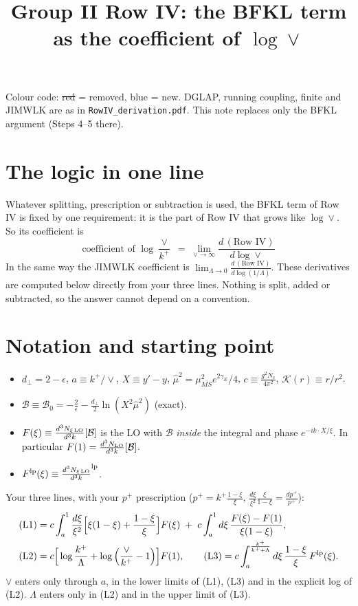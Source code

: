 \documentclass[10pt]{article}
\title{Group II Row IV: the BFKL term as the coefficient of $\log\vee$}
\date{}
\numberwithin{equation}{section}
\newcommand{\MSb}{\overline{MS}}
\newcommand{\NLO}[1]{\frac{d^3N_{#1}}{d^3k}}
\newcommand{\new}[1]{{\color{blue}#1}}
\newcommand{\old}[1]{{\color{red}\sout{#1}}}
\begin{document}
\maketitle
\noindent Colour code: \old{red} = removed, \new{blue} = new. DGLAP, running coupling, finite and JIMWLK are as in \texttt{RowIV\_derivation.pdf}. This note replaces only the BFKL argument (Steps 4--5 there).

\section{The logic in one line}
Whatever splitting, prescription or subtraction is used, the BFKL term of Row IV is fixed by one requirement: it is the part of Row IV that grows like $\log\vee$. So its coefficient is
\begin{equation}
\boxed{\;\text{coefficient of }\log\frac{\vee}{k^+}\;=\;\lim_{\vee\to\infty}\frac{d\,(\text{Row IV})}{d\log\vee}\;}
\label{eq:def}
\end{equation}
In the same way the JIMWLK coefficient is $\lim_{\Lambda\to0}\frac{d\,(\text{Row IV})}{d\log(1/\Lambda)}$. These derivatives are computed below directly from your three lines. Nothing is split, added or subtracted, so the answer cannot depend on a convention.

\section{Notation and starting point}
\begin{itemize}
\item $d_\perp=2-\epsilon$, $a\equiv k^+/\vee$, $X\equiv y'-y$, $\hat\mu^2=\mu^2_{\MSb}e^{2\gamma_E}/4$, $c\equiv\frac{g^2N_c}{4\pi^2}$, $\mathcal K(r)\equiv r/r^2$.
\item $\mathcal B\equiv\mathcal B_0=-\frac2\epsilon-\frac{d_\perp}{2}\ln(X^2\hat\mu^2)$ (exact).
\item $F(\xi)\equiv\NLO{\xi\,\rm LO}[\mathcal B]$ is the LO with $\mathcal B$ \emph{inside} the integral and phase $e^{-ik\cdot X/\xi}$. In particular $F(1)=\NLO{\rm LO}[\mathcal B]$.
\item $F^{\rm lp}(\xi)\equiv\NLO{\xi\,\rm LO}^{\rm lp}$.
\end{itemize}
Your three lines, with your $p^+$ prescription ($p^+=k^+\frac{1-\xi}{\xi}$, $\frac{d\xi}{\xi^2}\frac{\xi}{1-\xi}=\frac{dp^+}{p^+}$):
\begin{align}
\text{(L1)}&=c\int_a^1\frac{d\xi}{\xi^2}\Big[\xi(1-\xi)+\frac{1-\xi}{\xi}\Big]F(\xi)\;+\;c\int_a^1d\xi\,\frac{F(\xi)-F(1)}{\xi(1-\xi)},\notag\\
\text{(L2)}&=c\Big[\log\frac{k^+}{\Lambda}+\log\Big(\frac{\vee}{k^+}-1\Big)\Big]F(1),\qquad
\text{(L3)}=c\int_a^{\frac{k^+}{k^++\Lambda}}d\xi\,\frac{1-\xi}{\xi}\,F^{\rm lp}(\xi).\label{eq:lines}
\end{align}
$\vee$ enters only through $a$, in the lower limits of (L1), (L3) and in the explicit log of (L2). $\Lambda$ enters only in (L2) and in the upper limit of (L3).
\end{document}
